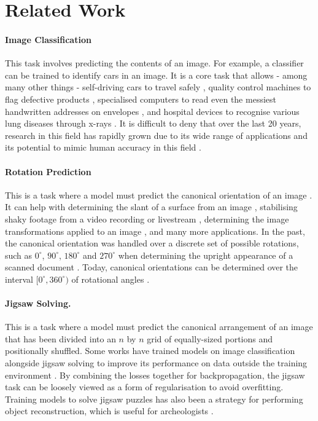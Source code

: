\documentclass{article}
\begin{document}
\section{Related Work}
\paragraph{Image Classification} This task involves predicting the contents of an image. For example, a classifier can be trained to identify cars in an image. It is a core task that allows - among many other things - self-driving cars to travel safely \cite{du2019self, kulkarni2018traffic, kuehnle1998winter}, quality control machines to flag defective products \cite{kunkel2020quality}, specialised computers to read even the messiest handwritten addresses on envelopes \cite{gilloux1993research}, and hospital devices to recognise various lung diseases through x-rays \cite{abbas2021classification, wang2017chestx}. It is difficult to deny that over the last 20 years, research in this field has rapidly grown due to its wide range of applications and its potential to mimic human accuracy in this field \cite{singh2020image}.

\paragraph{Rotation Prediction} This is a task where a model must predict the canonical orientation of an image \cite{8932427}. It can help with determining the slant of a surface from an image \cite{413886}, stabilising shaky footage from a video recording or livestream \cite{fischer2015image}, determining the image transformations applied to an image \cite{gidaris2018unsupervised}, and many more applications. In the past, the canonical orientation was handled over a discrete set of possible rotations, such as $0^\circ$, $90^\circ$, $180^\circ$ and $270^\circ$ when determining the upright appearance of a scanned document \cite{fischer2015image}. Today, canonical orientations can be determined over the interval $[0^\circ, 360^\circ)$ of rotational angles \cite{fischer2015image, 8932427}.

\paragraph{Jigsaw Solving.} This is a task where a model must predict the canonical arrangement of an image that has been divided into an $n$ by $n$ grid of equally-sized portions and positionally shuffled. Some works have trained models on image classification alongside jigsaw solving to improve its performance on data outside the training environment \cite{noroozi2016unsupervised}. By combining the losses together for backpropagation, the jigsaw task can be loosely viewed as a form of regularisation to avoid overfitting. Training models to solve jigsaw puzzles has also been a strategy for performing object reconstruction, which is useful for archeologists \cite{8451094}.
\end{document}
